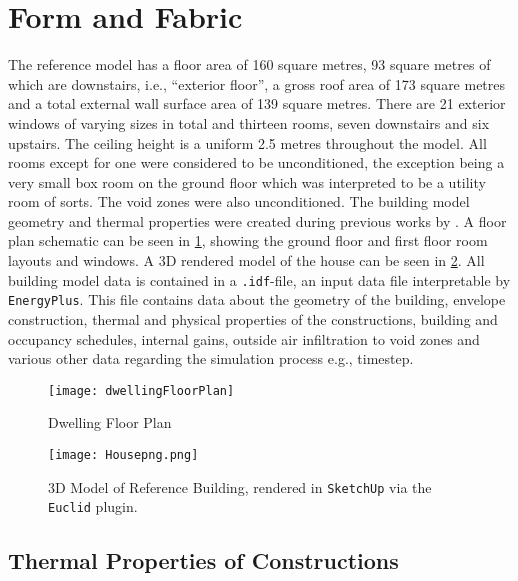 \section{Form and Fabric}
The reference model has a floor area of 160 square metres, 93 square metres of which are downstairs, i.e., ``exterior floor'', a gross roof area of 173 square metres and a total external wall surface area of 139 square metres. There are 21 exterior windows of varying sizes in total and thirteen rooms, seven downstairs and six upstairs. The ceiling height is a uniform 2.5 metres throughout the model. All rooms except for one were considered to be unconditioned, the exception being a very small box room on the ground floor which was interpreted to be a utility room of sorts. The void zones were also unconditioned. The building model geometry and thermal properties were created during previous works by \citeauthor{keogh_technical_2018} \cite{keogh_technical_2018}. A floor plan schematic can be seen in \cref{fig:floorplan}, showing the ground floor and first floor room layouts and windows. A 3D rendered model of the house can be seen in \cref{fig:3dmodel}. All building model data is contained in a \texttt{.idf}-file, an input data file interpretable by \texttt{EnergyPlus}. This file contains data about the geometry of the building, envelope construction, thermal and physical properties of the constructions, building and occupancy schedules, internal gains, outside air infiltration to void zones and various other data regarding the simulation process e.g., timestep. 

\begin{figure}[htb]
    \centering
    \texttt{[image: dwellingFloorPlan]}
    \caption{Dwelling Floor Plan}
    \label{fig:floorplan}
\end{figure}

\begin{figure}[htb]
    \centering
    \texttt{[image: Housepng.png]}
    \caption[3D Model of Reference Building]{3D Model of Reference Building, rendered in \texttt{SketchUp} via the \texttt{Euclid} plugin.}
    \label{fig:3dmodel}
\end{figure}


\subsection{Thermal Properties of Constructions}

